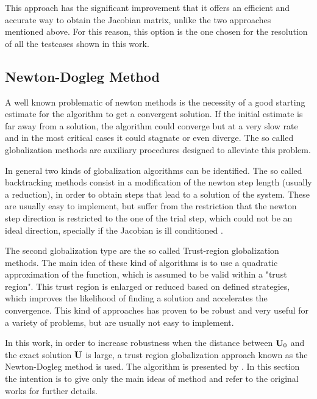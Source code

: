 This approach has the significant improvement that it offers an efficient and accurate way to obtain the Jacobian matrix, unlike the two approaches mentioned above. For this reason, this option is the one chosen for the resolution of all the testcases shown in this work.



\subsection{Newton-Dogleg Method} \label{sec:newton}
A well known problematic of newton methods is the necessity of a good starting estimate for the algorithm to get a convergent solution. If the initial estimate is far away from a solution, the algorithm could converge but at a very slow rate and in the most critical cases it could stagnate or even diverge. The so called globalization methods are auxiliary procedures designed to alleviate  this problem. 

In general two kinds of globalization algorithms can be identified. The so called backtracking methods consist in a modification of the newton step length (usually a reduction), in order to obtain steps that lead to a solution of the system. These are usually easy to implement, but suffer from the restriction that the newton step direction is restricted to the one of the trial step, which could not be an ideal direction, specially if the Jacobian is ill conditioned \parencite{pawlowskiGlobalizationTechniquesNewton2006}. 

The second globalization type are the so called Trust-region globalization methods. The main idea of these kind of algorithms is to use a quadratic approximation of the function, which is assumed to be valid within a "trust region". This trust region is enlarged or reduced based on defined strategies, which improves the likelihood of finding a solution and accelerates the convergence. This kind of approaches has proven to be robust and  very useful for a variety of problems, but are usually not easy to implement. 

In this work, in order to increase robustness when the distance between $\textbf{U}_0$ and the exact solution $\textbf{U}$ is large, a trust region globalization approach known as the Newton-Dogleg method is used. The algorithm is presented by \textcite{pawlowskiGlobalizationTechniquesNewton2006,pawlowskiInexactNewtonDogleg2008}. In this section the intention is to give only the main ideas of method and refer to the original works for further details. 

